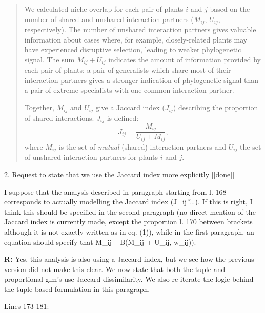 \documentclass[12pt]{letter}
\newenvironment{refquote}{\bigskip \begin{it}}{\end{it}\smallskip}
\begin{document}
		\begin{quotation}

			We calculated niche overlap for each pair of plants $i$ and $j$ based on the number of shared and unshared interaction partners ($M_{ij}$, $U_{ij}$, respectively). 
			The number of unshared interaction 
			partners gives valuable information about cases where, for example, 
			closely-related plants may have experienced disruptive selection, leading to weaker phylogenetic signal. 
			The sum $M_{ij} + U_{ij}$ indicates the amount of information  provided by each pair of plants: a pair of generalists which share most of their interaction partners gives a stronger indication of phylogenetic signal than a pair of extreme specialists with one common interaction partner.


			Together, $M_{ij}$ and $U_{ij}$ give a Jaccard index ($J_{ij}$) describing 
			the proportion of shared interactions. $J_{ij}$ is defined: 
			\begin{equation}
			J_{ij} = \frac{M_{ij}}{U_{ij}+M_{ij}} ,
			\end{equation}
			where $M_{ij}$ is the set of \emph{mutual} (shared) interaction partners and $U_{ij}$ the set of unshared interaction partners for plants $i$ and $j$.

		\end{quotation} 


	2. Request to state that we use the Jaccard index more explicitly [[done]]

		\begin{refquote}
			I suppose that the analysis described in paragraph starting from l. 168 corresponds to actually modelling the Jaccard index (J\_ij \~ ...). If this is right, I think this should be specified in the second paragraph (no direct mention of the Jaccard index is currently made, except the proportion l. 170 between brackets although it is not exactly written as in eq. (1)), while in the first paragraph, an equation should specify that M\_ij ~ B(M\_ij + U\_ij, w\_ij)).
		\end{refquote}


		\textbf{R:} Yes, this analysis is also using a Jaccard index, but we see how the previous version did not make this clear. We now state that both the tuple and proportional glm's use Jaccard dissimilarity. We also re-iterate the logic behind the tuple-based formulation in this paragraph.


			Lines 173-181:
\end{document}

